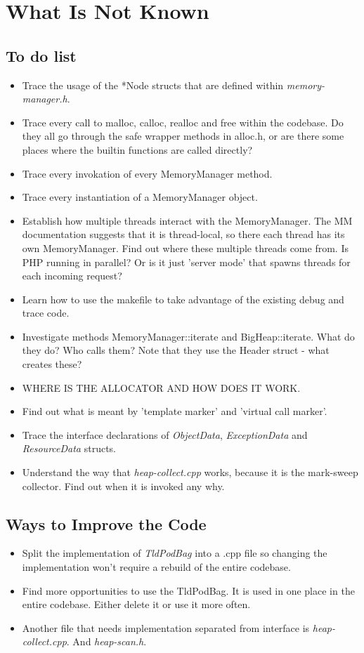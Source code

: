\chapter{What Is Not Known}
\section{To do list}
\begin{itemize}
  \item Trace the usage of the *Node structs that are defined within \emph{memory-manager.h}.
  \item Trace every call to malloc, calloc, realloc and free within the codebase. Do they all go through the safe wrapper methods in alloc.h, or are there some places where the builtin functions are called directly?
  \item Trace every invokation of every MemoryManager method.
  \item Trace every instantiation of a MemoryManager object.
  \item Establish how multiple threads interact with the MemoryManager. The MM documentation suggests that it is thread-local, so there each thread has its own MemoryManager. Find out where these multiple threads come from. Is PHP running in parallel? Or is it just 'server mode' that spawns threads for each incoming request?
  \item Learn how to use the makefile to take advantage of the existing debug and trace code.
  \item Investigate methods MemoryManager::iterate and BigHeap::iterate. What do they do? Who calls them? Note that they use the Header struct - what creates these?
  \item WHERE IS THE ALLOCATOR AND HOW DOES IT WORK.
  \item Find out what is meant by 'template marker' and 'virtual call marker'.
  \item Trace the interface declarations of \emph{ObjectData}, \emph{ExceptionData} and \emph{ResourceData} structs.
  \item Understand the way that \emph{heap-collect.cpp} works, because it is the mark-sweep collector. Find out when it is invoked any why.
\end{itemize}

\section{Ways to Improve the Code}
\begin{itemize}
  \item Split the implementation of \emph{TldPodBag} into a .cpp file so changing the implementation won't require a rebuild of the entire codebase.
  \item Find more opportunities to use the TldPodBag. It is used in one place in the entire codebase. Either delete it or use it more often.
  \item Another file that needs implementation separated from interface is \emph{heap-collect.cpp}. And \emph{heap-scan.h}.
\end{itemize}

